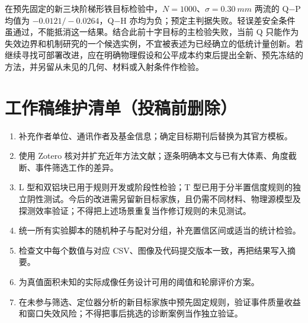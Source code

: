 \documentclass[UTF8,fontset=none,zihao=-4,a4paper]{ctexart}
\begin{document}
在预先固定的新三块阶梯形铁目标检验中，$N=1000$、$\sigma=\SI{0.30}{mm}$ 两流的 Q$-$P 均值为 $-0.0121/-0.0264$，Q$-$H 亦均为负；预定主判据失败。轻误差安全条件虽通过，不能抵消这一结果。结合此前十字目标的主检验失败，当前 Q 只能作为失效边界和机制研究的一个候选实例，不宜被表述为已经确立的低统计量创新。若继续寻找可部署改进，应在明确物理假设和公平成本约束后提出全新、预先冻结的方法，并另留从未见的几何、材料或入射条件作检验。




\clearpage
\section*{工作稿维护清单（投稿前删除）}
\begin{enumerate}[leftmargin=2em]
\item 补充作者单位、通讯作者及基金信息；确定目标期刊后替换为其官方模板。
\item 使用 Zotero 核对并扩充近年方法文献；逐条明确本文与已有大体素、角度截断、事件筛选工作的差异。
\item L 型和双铝块已用于规则开发或阶段性检验；T 型已用于分半置信度规则的独立阴性测试。今后的改进需另留新目标家族，且仍需不同材料、物理源模型及探测效率验证；不得把上述场景重复当作修订规则的未见测试。
\item 统一所有实验脚本的随机种子与配对分组，补充置信区间或适当的统计检验。
\item 检查文中每个数值与对应 CSV、图像及代码提交版本一致，再把结果写入摘要。
\item 为真值面积未知的实际成像任务设计可用的阈值和轮廓评价方案。
\item 在未参与筛选、定位器分析的新目标家族中预先固定规则，验证事件质量收益和窗口失效风险；不得把事后挑选的诊断案例当作独立验证。
\end{enumerate}
\end{document}
